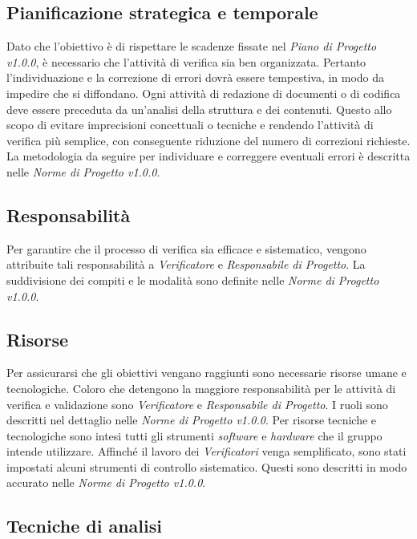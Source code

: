 \subsection{Pianificazione strategica e temporale}
Dato che l'obiettivo è di rispettare le scadenze fissate nel \textit{Piano di 
Progetto v1.0.0}, è necessario che l'attività di verifica sia ben organizzata. 
Pertanto l'individuazione e la correzione di errori dovrà essere tempestiva, in 
modo da impedire che si diffondano. Ogni attività di redazione di documenti o di codifica deve essere preceduta da un'analisi della struttura e dei contenuti. Questo allo scopo di evitare imprecisioni concettuali o tecniche e rendendo l'attività di verifica più semplice, con conseguente riduzione del numero di correzioni richieste.
La metodologia da seguire per individuare e correggere eventuali errori è descritta nelle \textit{Norme di Progetto v1.0.0}.

\subsection{Responsabilità}
Per garantire che il processo di verifica sia efficace e sistematico, vengono 
attribuite tali responsabilità a \textit{Verificatore} e \textit{Responsabile di Progetto}. La 
suddivisione dei compiti e le modalità sono definite nelle \textit{Norme di 
Progetto v1.0.0}.

\subsection{Risorse}
Per assicurarsi che gli obiettivi vengano raggiunti sono necessarie risorse umane e tecnologiche. Coloro che detengono la maggiore responsabilità per le attività di verifica e validazione sono \textit{Verificatore} e \textit{Responsabile di 
Progetto}. I ruoli sono descritti nel dettaglio nelle \textit{Norme di 
Progetto v1.0.0}. Per risorse tecniche e tecnologiche sono intesi tutti gli strumenti 
\textit{software} e \textit{hardware} che il gruppo intende utilizzare. 
Affinché il lavoro dei \textit{Verificatori} venga semplificato, sono stati impostati 
alcuni strumenti di controllo sistematico. Questi sono descritti in modo 
accurato nelle \textit{Norme di Progetto v1.0.0}.

\subsection{Tecniche di analisi}
\label{cap:sezione 2.8 Tecniche di analisi}

